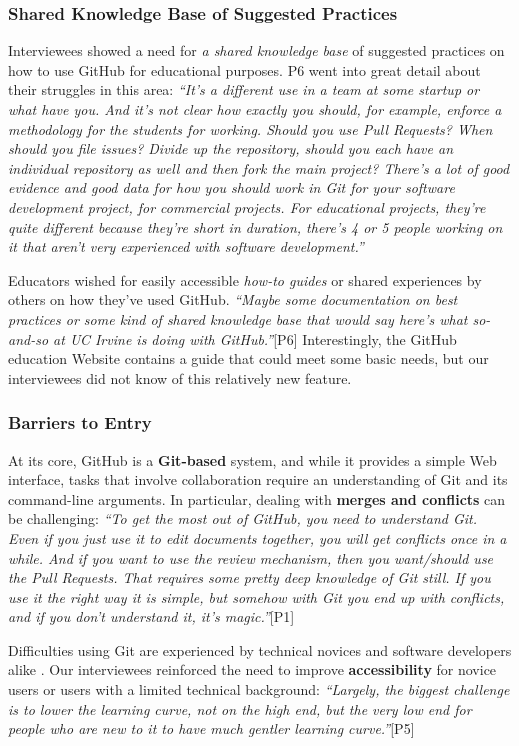\subsubsection{Shared Knowledge Base of Suggested Practices}
Interviewees showed a need for \textit{a shared knowledge base} of suggested practices on how to use GitHub for educational purposes. P6 went into great detail about their struggles in this area: \textit{``It's a different use in a team at some startup or what have you. And it's not clear how exactly you should, for example, enforce a methodology for the students for working. Should you use Pull Requests? When should you file issues? Divide up the repository, should you each have an individual repository as well and then fork the main project? There's a lot of good evidence and good data for how you should work in Git for your software development project, for commercial projects. For educational projects, they're quite different because they're short in duration, there's 4 or 5 people working on it that aren't very experienced with software development.''}

Educators wished for easily accessible \textit{how-to guides} or shared experiences by others on how they've used GitHub. \textit{``Maybe some documentation on best practices or some kind of shared knowledge base that would say here's what so-and-so at UC Irvine is doing with GitHub.''}[P6]
Interestingly, the GitHub education Website contains a guide that could meet some basic needs, but our interviewees did not know of this relatively new feature.


\subsubsection{Barriers to Entry}
At its core, GitHub is a \textbf{Git-based} system, and while it provides a simple Web interface, tasks that involve collaboration require an understanding of Git and its command-line arguments. In particular, dealing with \textbf{merges and conflicts} can be challenging: \textit{``To get the most out of GitHub, you need to understand Git. Even if you just use it to edit documents together, you will get conflicts once in a while. And if you want to use the review mechanism, then you want/should use the Pull Requests. That requires some pretty deep knowledge of Git still. If you use it the right way it is simple, but somehow with Git you end up with conflicts, and if you don't understand it, it's magic.''}[P1]

Difficulties using Git are experienced by technical novices and software developers alike \cite{perez2013s}. Our interviewees reinforced the need to improve \textbf{accessibility} for novice users or users with a limited technical background: \textit{``Largely, the biggest challenge is to lower the learning curve, not on the high end, but the very low end for people who are new to it to have much gentler learning curve.''}[P5]

